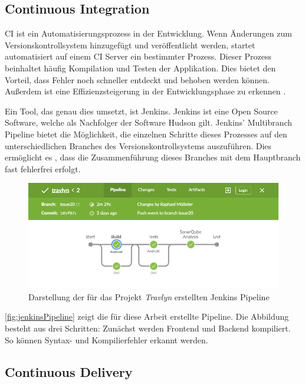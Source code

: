 		\subsection{Continuous Integration}
		
			\ac{CI} ist ein Automatisierungsprozess in der Entwicklung. Wenn Änderungen zum Versionskontrollsystem hinzugefügt und veröffentlicht werden, startet automatisiert auf einem \acs{CI} Server ein bestimmter Prozess. Dieser Prozess beinhaltet häufig Kompilation und Testen der Applikation. Dies bietet den Vorteil, dass Fehler noch schneller entdeckt und behoben werden können. Außerdem ist eine Effizienzsteigerung in der Entwicklungsphase zu erkennen \cite{MartinFowler.2292020}. 
			
			Ein Tool, das genau dies umsetzt, ist Jenkins. Jenkins ist eine Open Source Software, welche als Nachfolger der Software Hudson gilt. Jenkins' Multibranch Pipeline bietet die Möglichkeit, die einzelnen Schritte dieses Prozesses auf den unterschiedlichen Branches des Versionskontrollsystems auszuführen. Dies ermöglicht es \zB, dass die Zusammenführung dieses Branches mit dem Hauptbranch fast fehlerfrei erfolgt. \cite{CloudBees.322020}
			
			\begin{figure}[ht!]
				\centering
				\includegraphics[width=1\textwidth]{images/jenkins-pipeline.png}
				\caption{Darstellung der für das Projekt \textit{Travlyn} erstellten Jenkins Pipeline}
				\label{fig:jenkinsPipeline}
			\end{figure} 
		
			\autoref{fig:jenkinsPipeline} zeigt die für diese Arbeit erstellte Pipeline. Die Abbildung besteht aus drei Schritten: Zunächst werden Frontend und Backend kompiliert. So können Syntax- und Kompilierfehler erkannt werden. 
		
		\subsection{Continuous Delivery}
		
		
		                                                                                                                                                                                                                                                                                                                                         
	